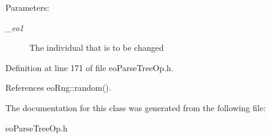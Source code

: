 \begin{Desc}
\item[Parameters:]
\begin{description}
\item[{\em \_\-eo1}]The individual that is to be changed \end{description}
\end{Desc}


Definition at line 171 of file eo\-Parse\-Tree\-Op.h.

References eo\-Rng::random().

The documentation for this class was generated from the following file:\begin{CompactItemize}
\item 
eo\-Parse\-Tree\-Op.h\end{CompactItemize}
